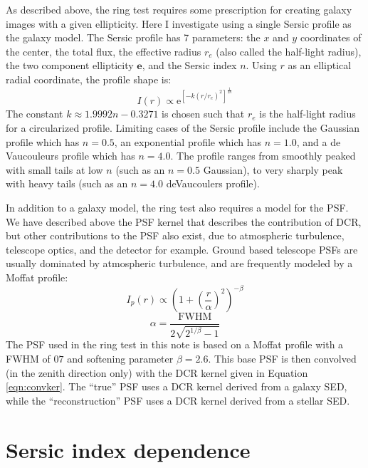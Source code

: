 \documentclass[apj]{emulateapj}
\begin{document}
As described above, the ring test requires some prescription for
creating galaxy images with a given ellipticity.  Here I investigate
using a single Sersic profile as the galaxy model.  The Sersic profile
has 7 parameters: the $x$ and $y$ coordinates of the center, the total
flux, the effective radius $r_e$ (also called the half-light radius),
the two component ellipticity $\mathbf{e}$, and the Sersic index $n$.
Using $r$ as an elliptical radial coordinate, the profile shape is:
\begin{equation}
  I(r) \propto \mathrm{e}^{[-k (r/r_e)^2]^{\frac{1}{2 n}}}
\end{equation}
The constant $k \approx 1.9992 n - 0.3271$ is chosen such that $r_e$
is the half-light radius for a circularized profile.  Limiting cases
of the Sersic profile include the Gaussian profile which has $n=0.5$,
an exponential profile which has $n=1.0$, and a de Vaucouleurs profile
which has $n=4.0$.  The profile ranges from smoothly peaked with small
tails at low $n$ (such as an $n=0.5$ Gaussian), to very sharply peak
with heavy tails (such as an $n=4.0$ deVaucoulers profile).

In addition to a galaxy model, the ring test also requires a model for
the PSF.  We have described above the PSF kernel that describes the
contribution of DCR, but other contributions to the PSF also exist,
due to atmospheric turbulence, telescope optics, and the detector for
example.  Ground based telescope PSFs are usually dominated by
atmospheric turbulence, and are frequently modeled by a Moffat
profile:
\begin{equation}
  I_p(r) \propto \left(1+\left(\frac{r}{\alpha}\right)^2\right)^{-\beta}
\end{equation}
\begin{equation}
  \alpha = \frac{\mathrm{FWHM}}{2\sqrt{2^{1/\beta}-1}}
\end{equation}
The PSF used in the ring test in this note is based on a Moffat
profile with a FWHM of $0$\farcs$7$ and softening parameter $\beta =
2.6$.  This base PSF is then convolved (in the zenith direction only)
with the DCR kernel given in Equation \ref{eqn:convker}.  The ``true''
PSF uses a DCR kernel derived from a galaxy SED, while the
``reconstruction'' PSF uses a DCR kernel derived from a stellar SED.

\section{Sersic index dependence}\label{sec:sersic}
\end{document}
